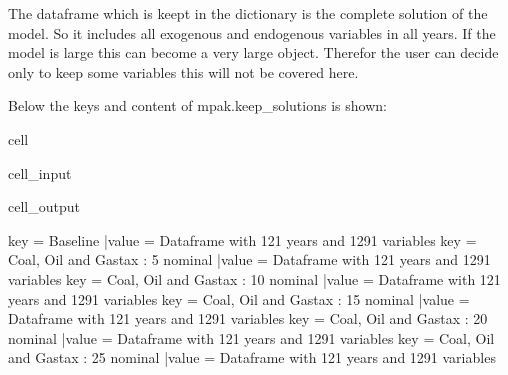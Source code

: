 \documentclass[letterpaper,10pt,english]{jupyterBook}
\begin{document}
\sphinxAtStartPar
The dataframe which is keept in the dictionary is the complete solution of the model. So it includes all exogenous and endogenous variables in all years. If the model is large this can become a very large object. Therefor the user can decide only
to keep some variables \sphinxhyphen{} this will not be covered here.

\sphinxAtStartPar
Below the keys and content of mpak.keep\_solutions is shown:

\begin{sphinxuseclass}{cell}\begin{sphinxVerbatimInput}

\begin{sphinxuseclass}{cell_input}
\begin{sphinxVerbatim}[commandchars=\\\{\}]
    
    \PYG{p}{[}\PYG{p}{]}\PYG{p}{[}\PYG{p}{]}
\end{sphinxVerbatim}

\end{sphinxuseclass}\end{sphinxVerbatimInput}
\begin{sphinxVerbatimOutput}

\begin{sphinxuseclass}{cell_output}
\begin{sphinxVerbatim}[commandchars=\\\{\}]
key = Baseline                          |value = Dataframe with 121 years and 1291 variables
key = Coal, Oil and Gastax : 5 nominal  |value = Dataframe with 121 years and 1291 variables
key = Coal, Oil and Gastax : 10 nominal |value = Dataframe with 121 years and 1291 variables
key = Coal, Oil and Gastax : 15 nominal |value = Dataframe with 121 years and 1291 variables
key = Coal, Oil and Gastax : 20 nominal |value = Dataframe with 121 years and 1291 variables
key = Coal, Oil and Gastax : 25 nominal |value = Dataframe with 121 years and 1291 variables
\end{sphinxVerbatim}

\end{sphinxuseclass}\end{sphinxVerbatimOutput}

\end{sphinxuseclass}
\end{document}
